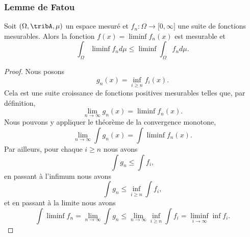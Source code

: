 \subsubsection{Lemme de Fatou}

\begin{lemma}   \label{LemFatouUOQqyk}
	Soit \( (\Omega,\tribA,\mu)\) un espace mesuré et \( f_n\colon \Omega\to \mathopen[ 0 , \infty \mathclose]  \) une suite de fonctions mesurables. Alors la fonction \( f(x)=\liminf f_n(x)\) est mesurable et
	\begin{equation}
		\int_{\Omega}\liminf f_nd\mu\leq\liminf\int_{\Omega}f_nd\mu.
	\end{equation}
\end{lemma}

\begin{proof}
	Nous posons
	\begin{equation}
		g_n(x)=\inf_{i\geq n}f_i(x).
	\end{equation}
	Cela est une suite croissance de fonctions positives mesurables telles que, par définition,
	\begin{equation}
		\lim_{n\to \infty}g_n(x)=\liminf f_n(x).
	\end{equation}
	Nous pouvons y appliquer le théorème de la convergence monotone,
	\begin{equation}
		\lim_{n\to \infty} \int g_n(x)=\int\liminf f_n(x).
	\end{equation}
	Par ailleurs, pour chaque \( i\geq n\) nous avons
	\begin{equation}
		\int g_n\leq \int f_i,
	\end{equation}
	en passant à l'infimum nous avons
	\begin{equation}
		\int g_n\leq \inf_{i\geq n}\int f_i,
	\end{equation}
	et en passant à la limite nous avons
	\begin{equation}
		\int\liminf f_n=\lim_{n\to \infty} \int g_n\leq \lim_{n\to \infty} \inf_{i\geq n}\int f_i=\liminf_{i\to\infty}\inf f_i.
	\end{equation}
\end{proof}

